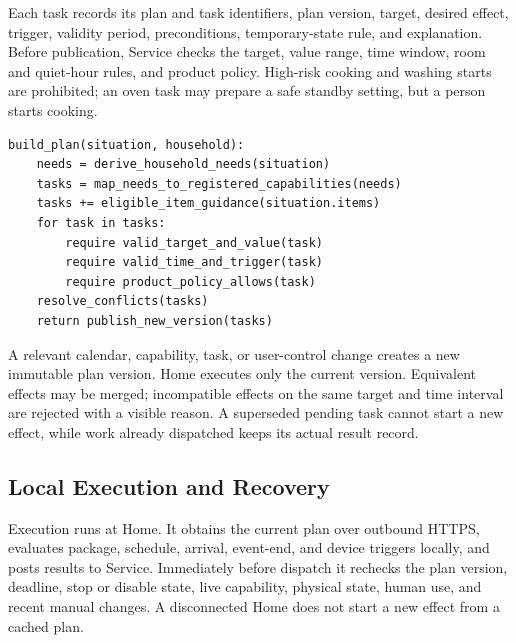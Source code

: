 \documentclass[conference]{IEEEtran}
\begin{document}
Each task records its plan and task identifiers, plan version, target, desired effect, trigger, validity period, preconditions, temporary-state rule, and explanation. Before publication, Service checks the target, value range, time window, room and quiet-hour rules, and product policy. High-risk cooking and washing starts are prohibited; an oven task may prepare a safe standby setting, but a person starts cooking.

\noindent\begin{minipage}{\columnwidth}
\begin{lstlisting}
build_plan(situation, household):
    needs = derive_household_needs(situation)
    tasks = map_needs_to_registered_capabilities(needs)
    tasks += eligible_item_guidance(situation.items)
    for task in tasks:
        require valid_target_and_value(task)
        require valid_time_and_trigger(task)
        require product_policy_allows(task)
    resolve_conflicts(tasks)
    return publish_new_version(tasks)
\end{lstlisting}
\end{minipage}
A relevant calendar, capability, task, or user-control change creates a new immutable plan version. Home executes only the current version. Equivalent effects may be merged; incompatible effects on the same target and time interval are rejected with a visible reason. A superseded pending task cannot start a new effect, while work already dispatched keeps its actual result record.

\subsection{Local Execution and Recovery}
Execution runs at Home. It obtains the current plan over outbound HTTPS, evaluates package, schedule, arrival, event-end, and device triggers locally, and posts results to Service. Immediately before dispatch it rechecks the plan version, deadline, stop or disable state, live capability, physical state, human use, and recent manual changes. A disconnected Home does not start a new effect from a cached plan.
\end{document}

